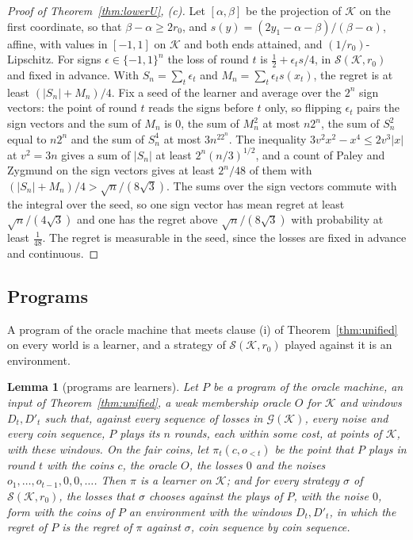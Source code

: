 \documentclass[11pt]{amsart}
\newtheorem{lemma}[theorem]{Lemma}
\theoremstyle{definition}
\numberwithin{equation}{section}
\newcommand{\cK}{\mathcal{K}}
\newcommand{\cG}{\mathscr{G}}
\begin{document}
\begin{proof}[Proof of Theorem~\ref{thm:lowerU}, (c)]
Let $[\alpha,\beta]$ be the projection of $\cK$ on the first coordinate, so that $\beta-\alpha\ge2r_0$, and $s(y)=(2y_1-\alpha-\beta)/(\beta-\alpha)$, affine, with values in $[-1,1]$ on $\cK$ and both ends attained, and $(1/r_0)$-Lipschitz. For signs $\epsilon\in\{-1,1\}^n$ the loss of round $t$ is $\frac12+\epsilon_ts/4$, in $\mathcal S(\cK,r_0)$ and fixed in advance. With $S_n=\sum_t\epsilon_t$ and $M_n=\sum_t\epsilon_ts(x_t)$, the regret is at least $(|S_n|+M_n)/4$. Fix a seed of the learner and average over the $2^n$ sign vectors: the point of round $t$ reads the signs before $t$ only, so flipping $\epsilon_t$ pairs the sign vectors and the sum of $M_n$ is $0$, the sum of $M_n^2$ at most $n2^n$, the sum of $S_n^2$ equal to $n2^n$ and the sum of $S_n^4$ at most $3n^22^n$. The inequality $3v^2x^2-x^4\le2v^3|x|$ at $v^2=3n$ gives a sum of $|S_n|$ at least $2^n(n/3)^{1/2}$, and a count of Paley and Zygmund on the sign vectors gives at least $2^n/48$ of them with $(|S_n|+M_n)/4>\sqrt n/(8\sqrt3)$. The sums over the sign vectors commute with the integral over the seed, so one sign vector has mean regret at least $\sqrt n/(4\sqrt3)$ and one has the regret above $\sqrt n/(8\sqrt3)$ with probability at least $\frac1{48}$. The regret is measurable in the seed, since the losses are fixed in advance and continuous.
\end{proof}

\subsection{Programs}\label{sec:lower-prog}

A program of the oracle machine that meets clause (i) of Theorem~\ref{thm:unified} on every world is a learner, and a strategy of $\mathcal S(\cK,r_0)$ played against it is an environment.

\begin{lemma}[programs are learners]\label{lem:bridge}
Let $P$ be a program of the oracle machine, an input of Theorem~\ref{thm:unified}, a weak membership oracle $O$ for $\cK$ and windows $D_t,D'_t$ such that, against every sequence of losses in $\cG(\cK)$, every noise and every coin sequence, $P$ plays its $n$ rounds, each within some cost, at points of $\cK$, with these windows. On the fair coins, let $\pi_t(c,o_{<t})$ be the point that $P$ plays in round $t$ with the coins $c$, the oracle $O$, the losses $0$ and the noises $o_1,\dots,o_{t-1},0,0,\dots$. Then $\pi$ is a learner on $\cK$; and for every strategy $\sigma$ of $\mathcal S(\cK,r_0)$, the losses that $\sigma$ chooses against the plays of $P$, with the noise $0$, form with the coins of $P$ an environment with the windows $D_t,D'_t$, in which the regret of $P$ is the regret of $\pi$ against $\sigma$, coin sequence by coin sequence.
\end{lemma}
\end{document}
